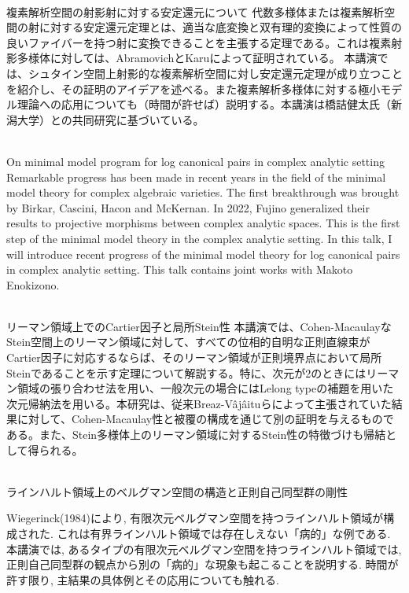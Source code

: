 \documentclass[dvipdfmx,a4paper,12pt]{article}
\theoremstyle{plain} %
\theoremstyle{definition} %
\begin{document}
\\
複素解析空間の射影射に対する安定還元について
\vskip3mm
代数多様体または複素解析空間の射に対する安定還元定理とは、適当な底変換と双有理的変換によって性質の良いファイバーを持つ射に変換できることを主張する定理である。これは複素射影多様体に対しては、AbramovichとKaruによって証明されている。
本講演では、シュタイン空間上射影的な複素解析空間に対し安定還元定理が成り立つことを紹介し、その証明のアイデアを述べる。また複素解析多様体に対する極小モデル理論への応用についても（時間が許せば）説明する。本講演は橋詰健太氏（新潟大学）との共同研究に基づいている。
\vskip5mm

\newpage

\vskip5mm

\\
On minimal model program for log canonical pairs in complex analytic setting 
\vskip3mm
Remarkable progress has been made in recent years in the field of the minimal model theory for complex algebraic varieties. The first breakthrough was brought by Birkar, Cascini, Hacon and McKernan. In 2022, Fujino generalized their results to projective morphisms between complex analytic spaces. This is the first step of the minimal model theory in the complex analytic setting. In this talk, I will introduce recent progress of the minimal model theory for log canonical pairs in complex analytic setting. This talk contains joint works with Makoto Enokizono.

\vskip8mm


\\
リーマン領域上でのCartier因子と局所Stein性
\vskip3mm
本講演では、Cohen-MacaulayなStein空間上のリーマン領域に対して、すべての位相的自明な正則直線束がCartier因子に対応するならば、そのリーマン領域が正則境界点において局所Steinであることを示す定理について解説する。特に、次元が2のときにはリーマン領域の張り合わせ法を用い、一般次元の場合にはLelong typeの補題を用いた次元帰納法を用いる。本研究は、従来Breaz-Vâjâituらによって主張されていた結果に対して、Cohen-Macaulay性と被覆の構成を通じて別の証明を与えるものである。また、Stein多様体上のリーマン領域に対するStein性の特徴づけも帰結として得られる。
\vskip8mm


\\
ラインハルト領域上のベルグマン空間の構造と正則自己同型群の剛性

\vskip3mm
Wiegerinck(1984)により, 有限次元ベルグマン空間を持つラインハルト領域が構成された. これは有界ラインハルト領域では存在しえない「病的」な例である. 本講演では, あるタイプの有限次元ベルグマン空間を持つラインハルト領域では, 正則自己同型群の観点から別の「病的」な現象も起こることを説明する. 時間が許す限り, 主結果の具体例とその応用についても触れる.
\vskip8mm
\end{document}
